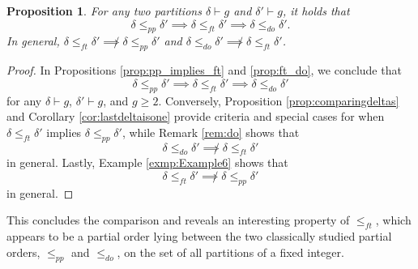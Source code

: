 \documentclass[11pt]{amsart}
\numberwithin{equation}{section}
\theoremstyle{plain}
\newcommand{\<}{\left \langle}
\renewcommand{\>}{\right \rangle}
\newtheorem{prop}[thm]{Proposition}
\theoremstyle{definition}
\theoremstyle{remark}
\begin{document}
\begin{prop}
\label{prop:last}
For any two partitions $\delta \vdash g$ and $\delta' \vdash g$, it holds that $$\delta \leq_{pp} \delta' \implies \delta \leq_{ft} \delta' \implies \delta \leq_{do} \delta'.$$
In general, $\delta \leq_{ft} \delta' \not \implies \delta \leq_{pp} \delta'$ and $\delta \leq_{do} \delta' \not \implies \delta \leq_{ft} \delta'$.
\end{prop}

\begin{proof}
In Propositions \ref{prop:pp_implies_ft} and \ref{prop:ft_do}, we conclude that $$\delta \leq_{pp} \delta' \implies \delta \leq_{ft} \delta' \implies \delta \leq_{do} \delta'$$ for any $\delta \vdash g$, $\delta' \vdash g$, and $g \geq 2$. Conversely, Proposition \ref{prop:comparingdeltas} and Corollary \ref{cor:lastdeltaisone} provide criteria and special cases for when $\delta \leq_{ft} \delta'$ implies $\delta \leq_{pp} \delta'$, while Remark \ref{rem:do} shows that $$\delta \leq_{do} \delta' \not \implies \delta \leq_{ft} \delta'$$ in general. Lastly, Example \ref{exmp:Example6} shows that $$\delta \leq_{ft} \delta' \not \implies \delta \leq_{pp} \delta'$$ in general.    
\end{proof}


This concludes the comparison and reveals an interesting property of $\leq_{ft}$, which appears to be a partial order lying between the two classically studied partial orders, $\leq_{pp}$ and $\leq_{do}$, on the set of all partitions of a fixed integer.

 

\normalsize
\end{document}
